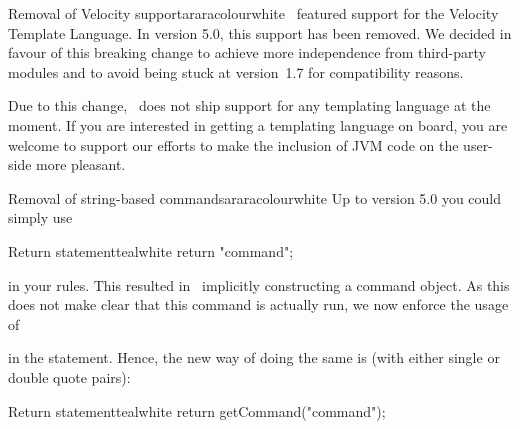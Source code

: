 \begin{messagebox}{Removal of Velocity support}{araracolour}{\icinfo}{white}
\arara\ featured support for the Velocity Template Language. In version 5.0, this support has been removed. We decided in favour of this breaking change to achieve more independence from third-party modules and to avoid being stuck at version~1.7 for compatibility reasons.

Due to this change, \arara\ does not ship support for any templating language at the moment. If you are interested in getting a templating language on board, you are welcome to support our efforts to make the inclusion of JVM code on the user-side more pleasant.
\end{messagebox}

\begin{messagebox}{Removal of string-based commands}{araracolour}{\icinfo}{white}
Up to version 5.0 you could simply use

\begin{codebox}{Return statement}{teal}{\icnote}{white}
return "command";
\end{codebox}

\noindent in your rules. This resulted in \arara\ implicitly constructing a command object. As this does not make clear that this command is actually run, we now enforce the usage of

\vspace{1em}


\vspace{1em}

\noindent in the  statement. Hence, the new way of doing the same is (with either single or double quote pairs):

\begin{codebox}{Return statement}{teal}{\icnote}{white}
return getCommand("command");
\end{codebox}
\end{messagebox}

